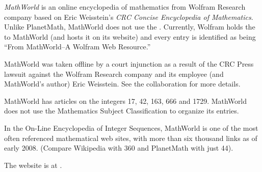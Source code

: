 \documentclass[12pt]{article}
\begin{document}
{\em MathWorld} is an online encyclopedia of mathematics from Wolfram Research company based on Eric Weisstein's {\it CRC Concise Encyclopedia of Mathematics}. Unlike PlanetMath, MathWorld does not use the . Currently, Wolfram holds the  to MathWorld (and hosts it on its website) and every entry is identified as being  ``From MathWorld--A Wolfram Web Resource.''

MathWorld was taken offline by a court injunction as a result of the CRC Press lawsuit against the Wolfram Research company and its employee (and MathWorld's author) Eric Weisstein.  See the collaboration  for more details.

MathWorld has articles on the integers 17, 42, 163, 666 and 1729. MathWorld does not use the Mathematics Subject Classification  to organize its entries.

In the On-Line Encyclopedia of Integer Sequences, MathWorld is one of the most often referenced mathematical web sites, with more than six thousand links as of early 2008. (Compare Wikipedia with 360 and PlanetMath with just 44).

The website is at .
\end{document}
